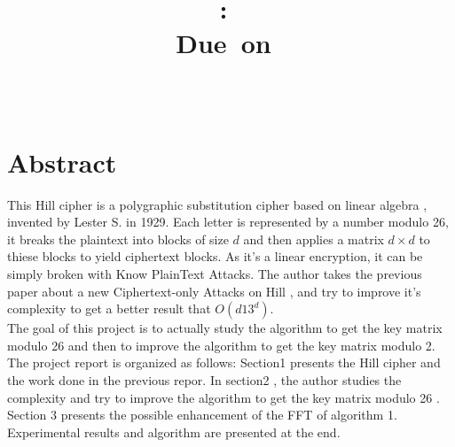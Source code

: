 \documentclass{article}
\title{
\vspace{2in}
\textmd{\textbf{\hmwkClass:\ \hmwkTitle}}\\
\normalsize\vspace{0.1in}\small{Due\ on\ \hmwkDueDate}\\
\vspace{0.1in}\large{\textit{\hmwkClassInstructor\ \hmwkClassTime}}
\vspace{3in}
}
\author{\textbf{\hmwkAuthorName}}
\date{} %
\begin{document}
\maketitle


\newpage
\section{Abstract}
This Hill cipher is a polygraphic substitution cipher based on linear algebra , invented by 
Lester S. in 1929. Each letter is represented by a number modulo 26, it breaks the plaintext into blocks of size $d$ and then applies a matrix $d \times d $ to thiese blocks to yield ciphertext blocks. As it's a linear encryption, it can be simply broken with Know PlainText Attacks.
The author takes the previous paper about a new Ciphertext-only Attacks on Hill , and try to improve it's complexity to get a better result that $O(d13^d)$.\\
${}$\hspace{1em}The goal of this project is to actually study the algorithm to get the key matrix modulo 26 and then to improve the algorithm to get the key matrix modulo 2.\\
${}$\hspace{1em}The project report is organized as follows: Section1 presents the Hill cipher and the work done in the previous repor. In section2 , the author studies the complexity and try to improve the algorithm to get the key matrix modulo 26 . Section 3 presents the possible enhancement of the FFT of algorithm 1. Experimental results and algorithm are presented at the end.
\newpage



\newpage
\tableofcontents
\newpage





\end{document}
